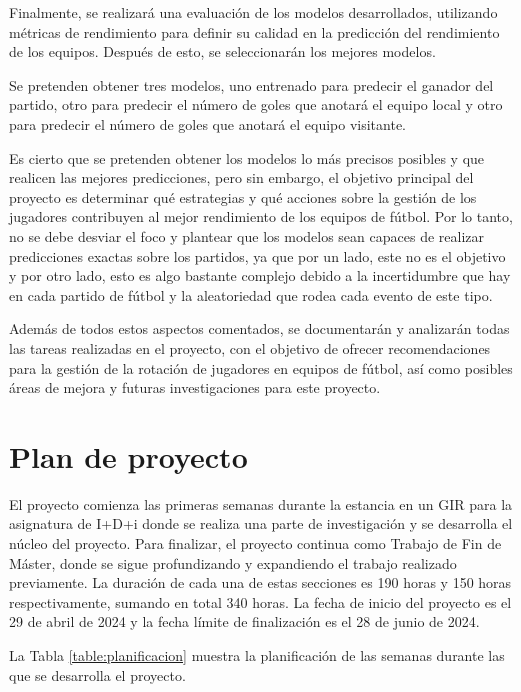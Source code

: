 Finalmente, se realizará una evaluación de los modelos desarrollados, utilizando métricas de rendimiento para definir su calidad en la predicción del rendimiento de los equipos. Después de esto, se seleccionarán los mejores modelos.

Se pretenden obtener tres modelos, uno entrenado para predecir el ganador del partido, otro para predecir el número de goles que anotará el equipo local y otro para predecir el número de goles que anotará el equipo visitante. 

Es cierto que se pretenden obtener los modelos lo más precisos posibles y que realicen las mejores predicciones, pero sin embargo, el objetivo principal del proyecto es determinar qué estrategias y qué acciones sobre la gestión de los jugadores contribuyen al mejor rendimiento de los equipos de fútbol. Por lo tanto, no se debe desviar el foco y plantear que los modelos sean capaces de realizar predicciones exactas sobre los partidos, ya que por un lado, este no es el objetivo y por otro lado, esto es algo bastante complejo debido a la incertidumbre que hay en cada partido de fútbol y la aleatoriedad que rodea cada evento de este tipo.

Además de todos estos aspectos comentados, se documentarán y analizarán todas las tareas realizadas en el proyecto, con el objetivo de ofrecer recomendaciones para la gestión de la rotación de jugadores en equipos de fútbol, así como posibles áreas de mejora y futuras investigaciones para este proyecto.




\section{Plan de proyecto}

El proyecto comienza las primeras semanas durante la estancia en un GIR para la asignatura de I+D+i donde se realiza una parte de investigación y se desarrolla el núcleo del proyecto. Para finalizar, el proyecto continua como Trabajo de Fin de Máster, donde se sigue profundizando y expandiendo el trabajo realizado previamente. La duración de cada una de estas secciones es 190 horas y 150 horas respectivamente, sumando en total 340 horas. La fecha de inicio del proyecto es el 29 de abril de 2024 y la fecha límite de finalización es el 28 de junio de 2024.


La Tabla \ref{table:planificacion} muestra la planificación de las semanas durante las que se desarrolla el proyecto.

